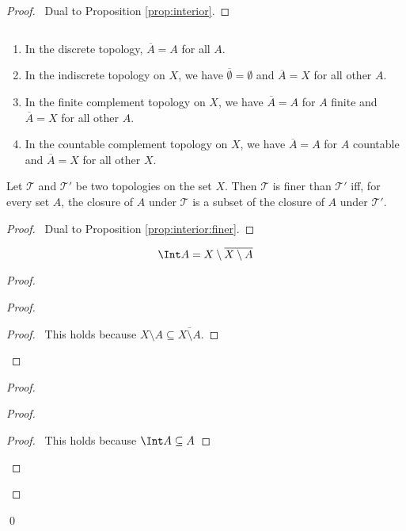 \begin{proof}
  \pf\ Dual to Proposition \ref{prop:interior}.
\end{proof}

\begin{ex}$ $
  \begin{enumerate}
    \item
    In the discrete topology, $\overline{A} = A$ for all $A$.
    \item
    In the indiscrete topology on $X$, we have $\overline{\emptyset} = \emptyset$ and $\overline{A} = X$ for all other $A$.
    \item
    In the finite complement topology on $X$, we have $\overline{A} = A$ for $A$ finite and $\overline{A} = X$ for all other $A$.
    \item
    In the countable complement topology on $X$, we have $\overline{A} = A$ for $A$ countable and $\overline{A} = X$ for all other $X$.
  \end{enumerate}
\end{ex}

\begin{prop}
  Let $\mathcal{T}$ and $\mathcal{T}'$ be two topologies on the set $X$. Then $\mathcal{T}$ is finer than $\mathcal{T}'$ iff, for every set $A$, the closure of $A$ under $\mathcal{T}$ is a subset of the closure of $A$ under $\mathcal{T}'$.
\end{prop}

\begin{proof}
  \pf\ Dual to Proposition \ref{prop:interior:finer}.
\end{proof}

\begin{prop}
  \label{prop:closure:interior}
  \[ \Int A = X \setminus \overline{X \setminus A} \]
\end{prop}

\begin{proof}
  \pf
  \begin{proof}
    \begin{proof}
      \pf\ This holds because $X \setminus A \subseteq \overline{X \setminus A}$.
    \end{proof}
  \end{proof}
  \begin{proof}
    \begin{proof}
      \begin{proof}
        \pf\ This holds because $\Int A \subseteq A$
      \end{proof}
    \end{proof}
  \end{proof}
  \qed
\end{proof}

